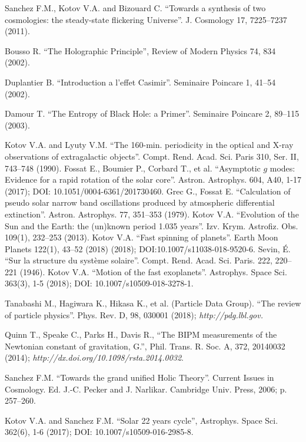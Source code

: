 \documentclass[twoside,draft]{article}
\begin{document}
\begin{sloppypar}
{\begin{thebibliography}{99}
 Sanchez F.M., Kotov V.A. and Bizouard C. ``Towards a synthesis of
two cosmologies: the steady-state flickering Universe''. J. Cosmology 17,
7225--7237 (2011).

 Bousso R. ``The Holographic Principle'', Review of Modern Physics
74, 834 (2002).

 Duplantier B. ``Introduction a l'effet Casimir''. Seminaire
Poincare 1, 41--54 (2002).

 Damour T. ``The Entropy of Black Hole: a Primer''. Seminaire
Poincare 2, 89--115 (2003).

 Kotov V.A. and Lyuty V.M. ``The 160-min. periodicity in the optical
and X-ray observations of extragalactic objects''. Compt. Rend. Acad. Sci.
Paris 310, Ser. II, 743--748 (1990). Fossat E., Boumier P., Corbard T., et al.
``Asymptotic $g$ modes: Evidence for a rapid rotation of the solar core''.
Astron. Astrophys. 604, A40, 1-17 (2017); DOI: 10.1051/0004-6361/201730460.
Grec G., Fossat E. ``Calculation of pseudo solar narrow band oscillations
produced by atmospheric differential extinction''. Astron. Astrophys. 77,
351--353 (1979). Kotov V.A. ``Evolution of the Sun and the Earth: the (un)known
period 1.035 years''. Izv. Krym. Astrofiz. Obs. 109(1), 232--253 (2013).
Kotov V.A. ``Fast spinning of planets''. Earth Moon Planets 122(1), 43--52
(2018) (2018); DOI:10.1007/s11038-018-9520-6. Sevin, \'E. ``Sur la structure du
syst\`eme solaire''. Compt. Rend. Acad. Sci. Paris. 222, 220--221 (1946).
Kotov V.A. ``Motion of the fast exoplanets''. Astrophys. Space Sci. 363(3), 1-5
(2018); DOI: 10.1007/s10509-018-3278-1.

 Tanabashi M., Hagiwara K., Hikasa K., et al. (Particle Data
Group). ``The review of particle physics''. Phys. Rev. D, 98, 030001 (2018);
{\it http://pdg.lbl.gov.}

 Quinn T., Speake C., Parks H., Davis R., ``The BIPM measurements
of the Newtonian constant of gravitation, G.'', Phil. Trans. R. Soc. A, 372,
20140032 (2014); {\it http://dx.doi.org/10.1098/rsta.2014.0032}.

 Sanchez F.M. ``Towards the grand unified Holic Theory''. Current
Issues in Cosmology. Ed. J.-C. Pecker and J. Narlikar. Cambridge Univ. Press,
2006; p. 257--260.

 Kotov V.A. and Sanchez F.M. ``Solar 22 years cycle'', Astrophys.
Space Sci. 362(6), 1-6 (2017); DOI: 10.1007/s10509-016-2985-8.


\end{thebibliography}}
\end{sloppypar}
\end{document}
